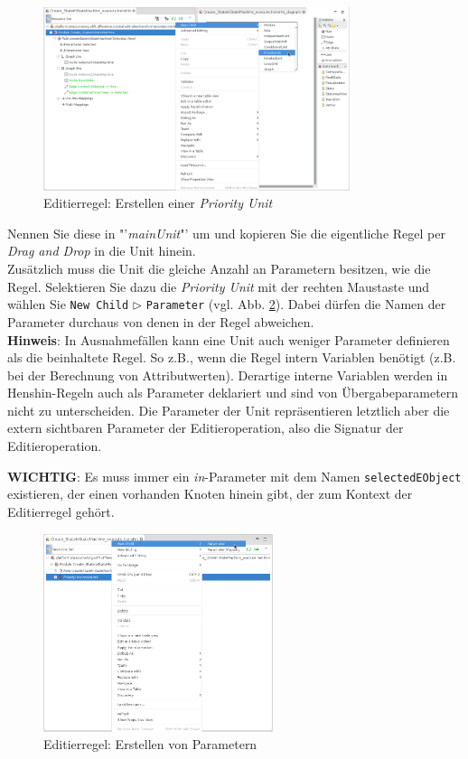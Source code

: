 \documentclass[a4paper]{scrartcl}
\begin{document}
\begin{figure}[H]
\centering
\includegraphics[width=0.8\textwidth]{graphics/silift-editrule_create_priority_unit.png}
\caption{Editierregel: Erstellen einer \textit{Priority Unit}}
\label{silift-editrule_create_priority_unit}
\end{figure}

Nennen Sie diese in "'\textit{mainUnit}"' um und kopieren Sie die eigentliche Regel per \textit{Drag and Drop} in die Unit hinein.\\
Zusätzlich muss die Unit die gleiche Anzahl an Parametern besitzen, wie die Regel. 
Selektieren Sie dazu die \textit{Priority Unit} mit der rechten Maustaste und wählen Sie \texttt{New Child} $\triangleright$ \texttt{Parameter} (vgl. Abb. \ref{silift-editrule_unit_create_parameter}). 
Dabei dürfen die Namen der Parameter durchaus von denen in der Regel abweichen.\\

\textbf{Hinweis}: In Ausnahmefällen kann eine Unit auch weniger Parameter definieren als die beinhaltete Regel. So z.B., wenn die Regel intern Variablen benötigt (z.B. bei der Berechnung von Attributwerten). Derartige interne Variablen werden in Henshin-Regeln auch als Parameter deklariert und sind von Übergabeparametern nicht zu unterscheiden. Die Parameter der Unit repräsentieren letztlich aber die extern sichtbaren Parameter der Editieroperation, also die Signatur der Editieroperation.

\textbf{WICHTIG}: Es muss immer ein \textit{in}-Parameter mit dem Namen \texttt{selectedEObject} existieren, der einen vorhanden Knoten hinein gibt, der zum Kontext der Editierregel gehört.


\begin{figure}[H]
\centering
\includegraphics[width=0.6\textwidth]{graphics/silift-editrule_unit_create_parameter.png}
\caption{Editierregel: Erstellen von Parametern}
\label{silift-editrule_unit_create_parameter}
\end{figure}
\end{document}
